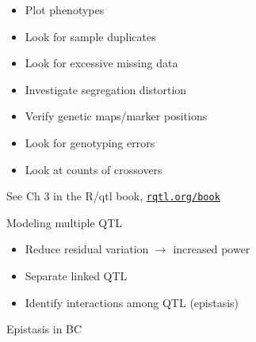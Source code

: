 \documentclass[12pt]{article}
\newcommand{\headsize}{\fontsize{35}{35} \selectfont}
\newcommand{\smallsize}{\fontsize{25}{30} \selectfont}
\begin{document}
\vspace{3cm}

\color{mywhite} \smallsize

\hfill \begin{minipage}[t]{9.5in}
\begin{itemize}
\itemsep18pt
\item Plot phenotypes
\item Look for sample duplicates
\item Look for excessive missing data
\item Investigate segregation distortion
\item Verify genetic maps/marker positions
\item Look for genotyping errors
\item Look at counts of crossovers
\end{itemize} \end{minipage}

\vspace{15mm}

\centerline{\color{myblue} See Ch 3 in the R/qtl book,
  \href{http://rqtl.org/book}{\tt rqtl.org/book}}


\newpage

\headsize \color{myyellow}
\hfill \begin{minipage}{5.75in}
\centering
Modeling multiple QTL
\end{minipage}

\vspace{3cm}

\color{mywhite} \smallsize

\hfill \begin{minipage}[t]{10in}
\begin{itemize}
\itemsep24pt
\item Reduce residual variation $\longrightarrow$ increased power

\item Separate linked QTL

\item Identify interactions among QTL {\color{myblue} (epistasis)}

\end{itemize}
\end{minipage}


\newpage

\headsize \color{myyellow}
\hfill \begin{minipage}{5.75in}
\centering
Epistasis in BC
\end{minipage}
\end{document}
